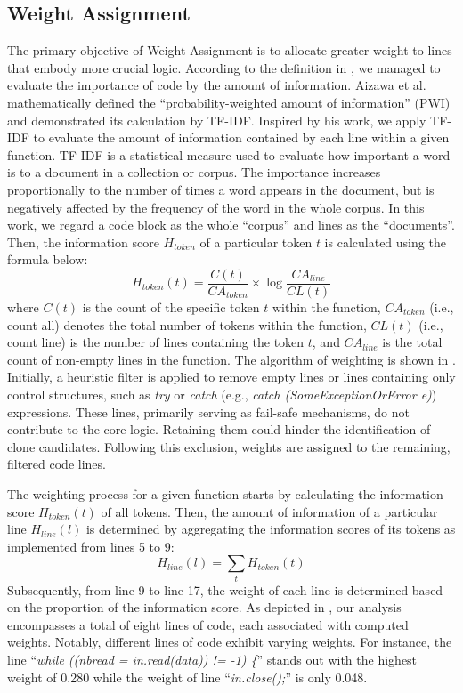 \subsection{Weight Assignment}
The primary objective of Weight Assignment is to allocate greater weight to lines that embody more crucial logic. According to the definition in , we managed to evaluate the importance of code by the amount of information. Aizawa et al.~\cite{AIZAWA200345} mathematically defined the ``probability-weighted amount of information'' (PWI) and demonstrated its calculation by TF-IDF. Inspired by his work, we apply TF-IDF to evaluate the amount of information contained by each line within a given function. TF-IDF is a statistical measure used to evaluate how important a word is to a document in a collection or corpus. The importance increases proportionally to the number of times a word appears in the document, but is negatively affected by the frequency of the word in the whole corpus. In this work, we regard a code block as the whole ``corpus'' and lines as the ``documents''. Then, the information score $H_{token}$ of a particular token $t$ is calculated using the formula below:
$$
H_{token}(t) = \frac{C(t)}{CA_{token}}\times \log\frac{CA_{line}}{CL(t)}
$$
where $C(t)$ is the count of the specific token $t$ within the function, $CA_{token}$ (i.e., count all) denotes the total number of tokens within the function, $CL(t)$ (i.e., count line) is the number of lines containing the token $t$, and $CA_{line}$ is the total count of non-empty lines in the function.
The algorithm of weighting is shown in .
Initially, a heuristic filter is applied to remove empty lines or lines containing only control structures, such as \textit{try} or \textit{catch} (e.g., \textit{catch (SomeExceptionOrError e)}) expressions. These lines, primarily serving as fail-safe mechanisms, do not contribute to the core logic. Retaining them could hinder the identification of clone candidates. Following this exclusion, weights are assigned to the remaining, filtered code lines.

The weighting process for a given function starts by calculating the information score $H_{token}(t)$ of all tokens. Then, the amount of information of a particular line $H_{line}(l)$ is determined by aggregating the information scores of its tokens as implemented from lines 5 to 9:
$$
H_{line}(l) = \sum_t H_{token}(t)
$$
Subsequently, from line 9 to line 17, the weight of each line is determined based on the proportion of the information score.  
As depicted in , our analysis encompasses a total of eight lines of code, each associated with computed weights. 
Notably, different lines of code exhibit varying weights. 
For instance, the line ``\textit{while ((nbread = in.read(data)) != -1) \{}'' stands out with the highest weight of 0.280 while the weight of line ``\textit{in.close();}'' is only 0.048.


